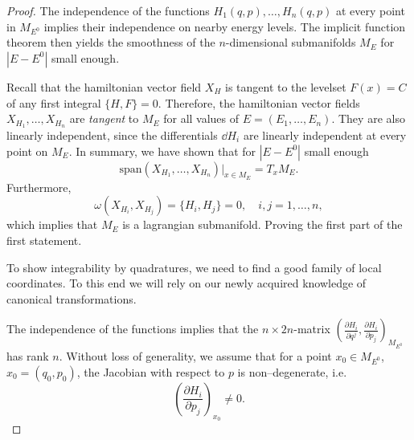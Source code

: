 \documentclass[english,fontsize=11pt,paper=b5]{scrbook}
\theoremstyle{definition}
\begin{document}
      \begin{proof}
        The independence of the functions $H_1(q,p), \ldots, H_n(q,p)$ at every point in $M_{E^0}$ implies their independence on nearby energy levels. The implicit function theorem then yields the smoothness of the $n$-dimensional submanifolds $M_E$ for $|E-E^0|$ small enough.

        Recall that the hamiltonian vector field $X_H$ is tangent to the levelset $F(x)=C$ of any first integral $\big\{H,F\big\} = 0$. Therefore, the hamiltonian vector fields $X_{H_1}, \ldots, X_{H_n}$ are \emph{tangent} to $M_E$ for all values of $E=(E_1,\ldots, E_n)$.
        They are also linearly independent, since the differentials $\dd H_i$ are linearly independent at every point on $M_E$.
        In summary, we have shown that for $|E-E^0|$ small enough
        \begin{equation}
          \mathrm{span}(X_{H_1}, \ldots, X_{H_n}) \big|_{x\in M_E} = T_x M_E.
        \end{equation}
        Furthermore,
        \begin{equation}
          \omega(X_{H_i}, X_{H_j}) = \big\{H_i, H_j\big\} =0, \quad i,j=1,\ldots,n,
        \end{equation}
        which implies that $M_E$ is a lagrangian submanifold. Proving the first part of the first statement.

        To show integrability by quadratures, we need to find a good family of local coordinates. To this end we will rely on our newly acquired knowledge of canonical transformations.

        The independence of the functions implies that the $n\times 2n$-matrix
        $\left(
          \frac{\partial H_i}{\partial q^j},
          \frac{\partial H_i}{\partial p_j}
        \right)_{M_{E^0}}$
        has rank $n$. Without loss of generality, we assume that for a point $x_0 \in M_{E^0}$, $x_0 =(q_0,p_0)$, the Jacobian with respect to $p$ is non--degenerate, i.e.
        \begin{equation}\label{eq:nondegHip}
          \left(
            \frac{\partial H_i}{\partial p_j}
          \right)_{x_0} \neq 0.
        \end{equation}


\end{proof}
\end{document}

